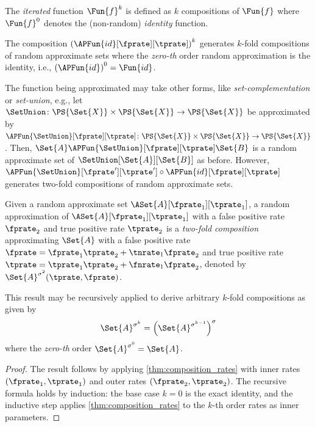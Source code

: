 \begin{definition}
	The \emph{iterated} function $\Fun{f}^k$ is defined as $k$ compositions of $\Fun{f}$ where $\Fun{f}^0$ denotes the (non-random) \emph{identity} function.
\end{definition}
The composition $\left(\APFun{id}[\fprate][\tprate]\right)^k$ generates $k$-fold compositions of random approximate sets where the \emph{zero-th} order random approximation is the identity, i.e., $\left(\APFun{id}\right)^0 = \Fun{id}$.

The function being approximated may take other forms, like \emph{set-complementation} or \emph{set-union}, e.g.,
let $\SetUnion \colon \PS{\Set{X}} \times \PS{\Set{X}} \to \PS{\Set{X}}$ be approximated by $\APFun{\SetUnion}[\fprate][\tprate] \colon \PS{\Set{X}} \times \PS{\Set{X}} \to \PS{\Set{X}}$.
Then, $\Set{A} \APFun{\SetUnion}[\fprate][\tprate] \Set{B}$ is a random approximate set of $\SetUnion[\Set{A}][\Set{B}]$ as before.
However, $\APFun{\SetUnion}[\fprate'][\tprate'] \circ \APFun{id}[\fprate][\tprate]$ generates two-fold compositions of random approximate sets.

\begin{theorem}
\label{thm:twofold_composition}
	Given a random approximate set $\ASet{A}[\fprate_1][\tprate_1]$, a random approximation of $\ASet{A}[\fprate_1][\tprate_1]$ with a false positive rate $\fprate_2$ and true positive rate $\tprate_2$ is a \emph{two-fold composition} approximating $\Set{A}$ with a false positive rate $\fprate = \fprate_1 \tprate_2 + \tnrate_1 \fprate_2$ and true positive rate $\tprate = \tprate_1 \tprate_2 + \fnrate_1 \fprate_2$, denoted by $\Set{A}^{\sigma^2}(\tprate,\fprate)$.

	This result may be recursively applied to derive arbitrary $k$-fold compositions as given by
	\begin{equation}
		\Set{A}^{\sigma^k} = \left(\Set{A}^{\sigma^{k-1}}\right)^{\sigma}
	\end{equation}
	where the \emph{zero-th} order $\Set{A}^{\sigma^0} = \Set{A}$.
\end{theorem}
\begin{proof}
The result follows by applying \cref{thm:composition_rates} with inner
rates $(\fprate_1, \tprate_1)$ and outer rates $(\fprate_2, \tprate_2)$.
The recursive formula holds by induction: the base case $k = 0$ is the
exact identity, and the inductive step applies \cref{thm:composition_rates}
to the $k$-th order rates as inner parameters.
\end{proof}

